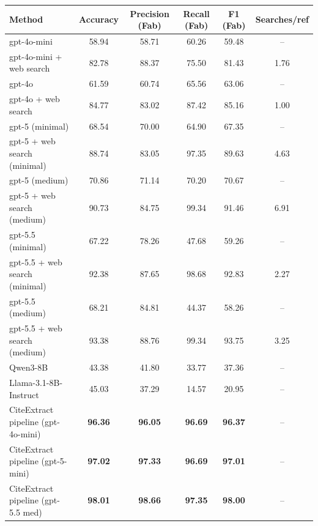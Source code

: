 \begin{tabular}{lccccc}
\toprule
Method & Accuracy & Precision (Fab) & Recall (Fab) & F1 (Fab) & Searches/ref \\
\midrule
gpt-4o-mini & 58.94 & 58.71 & 60.26 & 59.48 & -- \\
gpt-4o-mini + web search & 82.78 & 88.37 & 75.50 & 81.43 & 1.76 \\
gpt-4o & 61.59 & 60.74 & 65.56 & 63.06 & -- \\
gpt-4o + web search & 84.77 & 83.02 & 87.42 & 85.16 & 1.00 \\
gpt-5 (minimal) & 68.54 & 70.00 & 64.90 & 67.35 & -- \\
gpt-5 + web search (minimal) & 88.74 & 83.05 & 97.35 & 89.63 & 4.63 \\
gpt-5 (medium) & 70.86 & 71.14 & 70.20 & 70.67 & -- \\
gpt-5 + web search (medium) & 90.73 & 84.75 & 99.34 & 91.46 & 6.91 \\
gpt-5.5 (minimal) & 67.22 & 78.26 & 47.68 & 59.26 & -- \\
gpt-5.5 + web search (minimal) & 92.38 & 87.65 & 98.68 & 92.83 & 2.27 \\
gpt-5.5 (medium) & 68.21 & 84.81 & 44.37 & 58.26 & -- \\
gpt-5.5 + web search (medium) & 93.38 & 88.76 & 99.34 & 93.75 & 3.25 \\
Qwen3-8B & 43.38 & 41.80 & 33.77 & 37.36 & -- \\
Llama-3.1-8B-Instruct & 45.03 & 37.29 & 14.57 & 20.95 & -- \\
CiteExtract pipeline (gpt-4o-mini) & \textbf{96.36} & \textbf{96.05} & \textbf{96.69} & \textbf{96.37} & -- \\
CiteExtract pipeline (gpt-5-mini) & \textbf{97.02} & \textbf{97.33} & \textbf{96.69} & \textbf{97.01} & -- \\
CiteExtract pipeline (gpt-5.5 med) & \textbf{98.01} & \textbf{98.66} & \textbf{97.35} & \textbf{98.00} & -- \\
\bottomrule
\end{tabular}
